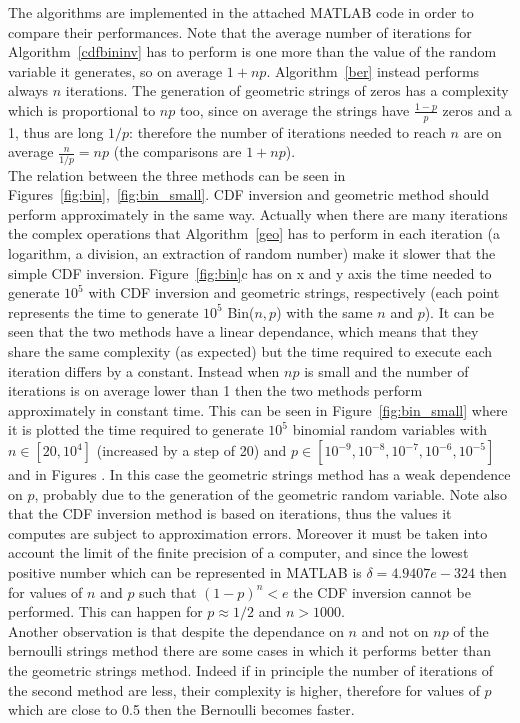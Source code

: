 \documentclass[10pt]{article}
\begin{document}
The algorithms are implemented in the attached MATLAB code in order to compare their performances. Note that the average number of iterations for Algorithm~\ref{cdfbininv} has to perform is one more than the value of the random variable it generates, so on average $1 + np$. Algorithm~\ref{ber} instead performs always $n$ iterations. The generation of geometric strings of zeros has a complexity which is proportional to $np$ too, since on average the strings have $\frac{1-p}{p}$ zeros and a 1, thus are long $1/p$: therefore the number of iterations needed to reach $n$ are on average $\frac{n}{1/p} = np$ (the comparisons are $1+np$). \\
The relation between the three methods can be seen in Figures~\ref{fig:bin},~\ref{fig:bin_small}. CDF inversion and geometric method should perform approximately in the same way. Actually when there are many iterations the complex operations that Algorithm~\ref{geo} has to perform in each iteration (a logarithm, a division, an extraction of random number) make it slower that the simple CDF inversion. Figure~\ref{fig:bin}c has on x and y axis the time needed to generate $10^5$ with CDF inversion and geometric strings, respectively (each point represents the time to generate $10^5$ Bin($n,p$) with the same $n$ and $p$). It can be seen that the two methods have a linear dependance, which means that they share the same complexity (as expected) but the time required to execute each iteration differs by a constant. Instead when $np$ is small and the number of iterations is on average lower than 1 then the two methods perform approximately in constant time. This can be seen in Figure~\ref{fig:bin_small} where it is plotted the time required to generate $10^5$ binomial random variables with $n\in [20, 10^4]$ (increased by a step of 20) and $p \in [10^{-9}, 10^{-8}, 10^{-7}, 10^{-6}, 10^{-5}]$ and in Figures .
In this case the geometric strings method has a weak dependence on $p$, probably due to the generation of the geometric random variable. Note also that the CDF inversion method is based on iterations, thus the values it computes are subject to approximation errors. Moreover it must be taken into account the limit of the finite precision of a computer, and since the lowest positive number which can be represented in MATLAB is $\delta = 4.9407e-324$ then for values of $n$ and $p$ such that $(1-p)^n < e$ the CDF inversion cannot be performed. This can happen for $p \approx 1/2$ and $n > 1000$. \\
Another observation is that despite the dependance on $n$ and not on $np$ of the bernoulli strings method there are some cases in which it performs better than the geometric strings method. Indeed if in principle the number of iterations of the second method are less, their complexity is higher, therefore for values of $p$ which are close to 0.5 then the Bernoulli becomes faster.
\end{document}

